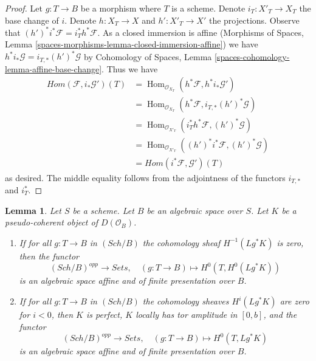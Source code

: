 \documentclass{stacks-project}
\theoremstyle{plain}
\newtheorem{lemma}[subsection]{Lemma}
\theoremstyle{definition}
\theoremstyle{remark}
\numberwithin{equation}{subsection}
\def\Hom{\mathop{\mathrm{Hom}}\nolimits}
\def\Sch{\mathit{Sch}}
\begin{document}
\begin{proof}
Let $g : T \to B$ be a morphism where $T$ is a scheme.
Denote $i_T : X'_T \to X_T$ the base change of $i$.
Denote $h : X_T \to X$ and $h' : X'_T \to X'$ the projections.
Observe that $(h')^*i^*\mathcal{F} = i_T^*h^*\mathcal{F}$.
As a closed immersion is affine
(Morphisms of Spaces, Lemma
\ref{spaces-morphisms-lemma-closed-immersion-affine})
we have $h^*i_*\mathcal{G} = i_{T, *}(h')^*\mathcal{G}$ by
Cohomology of Spaces, Lemma \ref{spaces-cohomology-lemma-affine-base-change}.
Thus we have
\begin{align*}
\mathit{Hom}(\mathcal{F}, i_*\mathcal{G}')(T)
& =
\Hom_{\mathcal{O}_{X_T}}(h^*\mathcal{F}, h^*i_*\mathcal{G}') \\
& =
\Hom_{\mathcal{O}_{X_T}}(h^*\mathcal{F}, i_{T, *}(h')^*\mathcal{G}) \\
& =
\Hom_{\mathcal{O}_{X'_T}}(i_T^*h^*\mathcal{F}, (h')^*\mathcal{G}) \\
& =
\Hom_{\mathcal{O}_{X'_T}}((h')^*i^*\mathcal{F}, (h')^*\mathcal{G}) \\
& =
\mathit{Hom}(i^*\mathcal{F}, \mathcal{G}')(T)
\end{align*}
as desired. The middle equality follows from the adjointness of the functors
$i_{T, *}$ and $i_T^*$.
\end{proof}

\begin{lemma}
\label{lemma-cohomology-perfect-complex}
Let $S$ be a scheme. Let $B$ be an algebraic space over $S$.
Let $K$ be a pseudo-coherent object of $D(\mathcal{O}_B)$.
\begin{enumerate}
\item If for all $g : T \to B$ in $(\Sch/B)$ the cohomology sheaf
$H^{-1}(Lg^*K)$ is zero, then the functor
$$
(\Sch/B)^{opp} \longrightarrow \textit{Sets},\quad
(g : T \to B) \longmapsto H^0(T, H^0(Lg^*K))
$$
is an algebraic space affine and of finite presentation over $B$.
\item If for all $g : T \to B$ in $(\Sch/B)$ the cohomology sheaves
$H^i(Lg^*K)$ are zero for $i < 0$, then $K$ is perfect,
$K$ locally has tor amplitude in $[0, b]$, and the functor
$$
(\Sch/B)^{opp} \longrightarrow \textit{Sets},\quad
(g : T \to B) \longmapsto H^0(T, Lg^*K)
$$
is an algebraic space affine and of finite presentation over $B$.
\end{enumerate}
\end{lemma}
\end{document}
